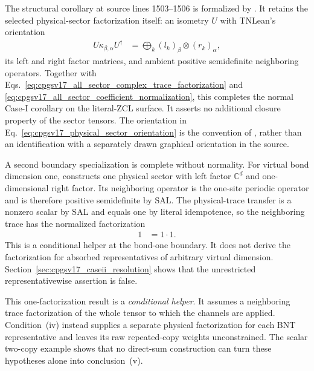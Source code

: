 \documentclass{article}
\begin{document}
The structural corollary at source lines 1503--1506 is formalized by
.
It retains the selected physical-sector factorization itself: an isometry $U$
with TNLean's orientation
\begin{align}
    U\kappa_{\beta,\alpha}U^\dagger
        &= \bigoplus_k
        (l_k)_\beta\otimes(r_k)_\alpha,
    \label{eq:cpgsv17_physical_sector_orientation}
\end{align}
its left and right factor matrices, and ambient positive semidefinite
neighboring operators. Together with
Eqs.~\ref{eq:cpgsv17_all_sector_complex_trace_factorization} and
\ref{eq:cpgsv17_all_sector_coefficient_normalization}, this completes the
normal Case-I corollary on the literal-ZCL surface. It asserts no additional
closure property of the sector tensors. The orientation in
Eq.~\ref{eq:cpgsv17_physical_sector_orientation} is the convention of
, rather than an identification
with a separately drawn graphical orientation in the source.

A second boundary specialization is complete without normality. For virtual
bond dimension one,
constructs one physical sector with left factor $\mathbb C^d$ and
one-dimensional right factor. Its neighboring operator is the one-site
periodic operator and is therefore positive semidefinite by SAL. The
physical-trace transfer is a nonzero scalar by SAL and equals one by literal
idempotence, so the neighboring trace has the normalized factorization
\begin{align}
    1
        &= 1\cdot 1.
    \label{eq:cpgsv17_bond_one_trace_factorization}
\end{align}
This is a conditional helper at the bond-one boundary. It does not derive the
factorization for absorbed representatives of arbitrary virtual dimension.
Section~\ref{sec:cpgsv17_caseii_resolution} shows that the unrestricted
representativewise assertion is false.

This one-factorization result is a \emph{conditional helper}. It assumes a
neighboring trace factorization of the whole tensor to which the channels are
applied. Condition~(iv) instead supplies a separate physical factorization for
each BNT representative and leaves its raw repeated-copy weights
unconstrained. The scalar two-copy example shows that no direct-sum
construction can turn these hypotheses alone into conclusion~(v).
\end{document}
